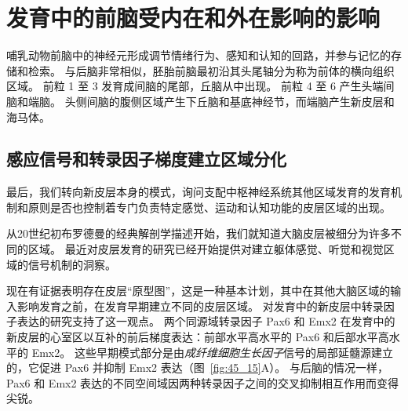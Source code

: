 \section{发育中的前脑受内在和外在影响的影响}

哺乳动物前脑中的神经元形成调节情绪行为、感知和认知的回路，并参与记忆的存储和检索。
与后脑非常相似，胚胎前脑最初沿其头尾轴分为称为前体的横向组织区域。
前粒 1 至 3 发育成间脑的尾部，丘脑从中出现。
前粒 4 至 6 产生头端间脑和端脑。
头侧间脑的腹侧区域产生下丘脑和基底神经节，而端脑产生新皮层和海马体。



\subsection{感应信号和转录因子梯度建立区域分化}

最后，我们转向新皮层本身的模式，询问支配中枢神经系统其他区域发育的发育机制和原则是否也控制着专门负责特定感觉、运动和认知功能的皮层区域的出现。


从20世纪初布罗德曼的经典解剖学描述开始，我们就知道大脑皮层被细分为许多不同的区域。
最近对皮层发育的研究已经开始提供对建立躯体感觉、听觉和视觉区域的信号机制的洞察。


现在有证据表明存在皮层“原型图”，这是一种基本计划，其中在其他大脑区域的输入影响发育之前，在发育早期建立不同的皮层区域。
对发育中的新皮层中转录因子表达的研究支持了这一观点。
两个同源域转录因子 Pax6 和 Emx2 在发育中的新皮层的心室区以互补的前后梯度表达：前部水平高水平的 Pax6 和后部水平高水平的 Emx2。
这些早期模式部分是由\textit{成纤维细胞生长因子}信号的局部延髓源建立的，它促进 Pax6 并抑制 Emx2 表达（图~\ref{fig:45_15}A）。
与后脑的情况一样，Pax6 和 Emx2 表达的不同空间域因两种转录因子之间的交叉抑制相互作用而变得尖锐。


